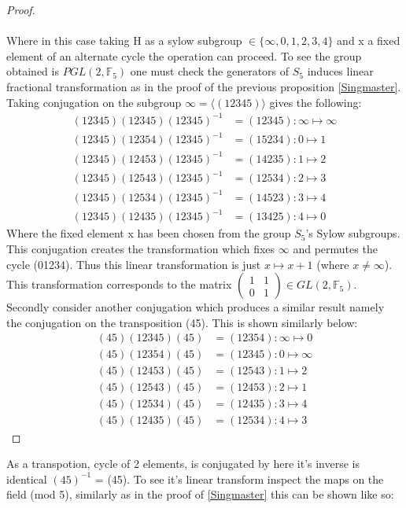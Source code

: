 \documentclass{article}
\begin{document}
\begin{proof}
\paragraph*{}
Where in this case taking H as a sylow subgroup $\in \{\infty,0,1,2,3,4\}$ and x a fixed element of an alternate cycle the operation can proceed. To see the group obtained is $PGL(2,\mathbb{F}_5)$ one must check the generators of $S_5$ induces linear fractional transformation as in the proof of the previous proposition \ref{Singmaster}. Taking conjugation on the subgroup $\infty = \langle(12345) \rangle$ gives the following:
\begin{align*}
(12345)(12345)(12345)^{-1} &= (12345) :\infty \mapsto \infty \\
(12345)(12354)(12345)^{-1} &= (15234) :0 \mapsto 1\\
(12345)(12453)(12345)^{-1} &= (14235) :1 \mapsto 2\\
(12345)(12543)(12345)^{-1} &= (12534) :2 \mapsto 3\\
(12345)(12534)(12345)^{-1} &= (14523) :3 \mapsto 4\\
(12345)(12435)(12345)^{-1} &= (13425) :4 \mapsto 0
\end{align*}
Where the fixed element x has been chosen from the group $S_5$'s Sylow subgroups. This conjugation creates the transformation which fixes $\infty$ and permutes the cycle (01234). Thus this linear transformation is just $x \mapsto x + 1$ (where $x \neq\infty$). This transformation corresponds to the matrix $\begin{pmatrix} 1 & 1 \\ 0 & 1\end{pmatrix} \in GL(2,\mathbb{F}_{5})$. Secondly consider another conjugation which produces a similar result namely the conjugation on the transposition (45). This is shown similarly below:
\begin{align*}
(45)(12345)(45) &= (12354) :\infty \mapsto 0 \\
(45)(12354)(45) &= (12345) :0 \mapsto \infty\\
(45)(12453)(45) &= (12543) :1 \mapsto 2\\
(45)(12543)(45) &= (12453) :2 \mapsto 1\\
(45)(12534)(45) &= (12435) :3 \mapsto 4\\
(45)(12435)(45) &= (12534) :4 \mapsto 3
\end{align*}
\end{proof}
As a transpotion, cycle of 2 elements, is conjugated by here it's inverse is identical $(45)^{-1}$ = (45). To see it's linear transform inspect the maps on the field (mod 5), similarly as in the proof of \ref{Singmaster} this can be shown like so:
\end{document}

